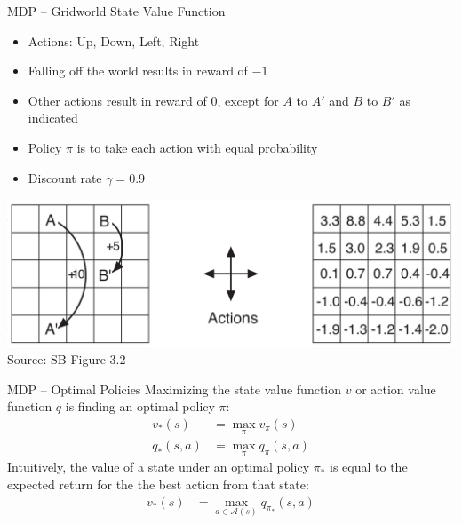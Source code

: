 \documentclass[ignorenonframetext,xcolor=x11names]{beamer}
\begin{document}
\begin{frame}{MDP -- Gridworld State Value Function}
\begin{itemize}
   \item Actions: Up, Down, Left, Right
   \item Falling off the world results in reward of $-1$ 
   \item Other actions result in reward of $0$, except for $A$ to $A'$ and $B$ to $B'$ as indicated
   \item Policy $\pi$ is to take each action with equal probability
   \item Discount rate $\gamma = 0.9$
\end{itemize}
\begin{center}
\includegraphics[width=\textwidth]{screen4.png} \\

\scriptsize Source: SB Figure 3.2 \normalsize
\end{center}
\end{frame}

\begin{frame}{MDP -- Optimal Policies}
Maximizing the state value function $v$ or action value function $q$ is finding an optimal policy $\pi$:
\begin{align*}
v_*(s) &= \operatorname*{max}_\pi v_\pi(s) \\
q_*(s, a) &= \operatorname*{max}_\pi q_\pi(s, a)
\end{align*}
Intuitively, the value of a state under an optimal policy $\pi_*$ is equal to the expected return for the the best action from that state:
\begin{align*}
v_*(s) &= \max_{a \in \mathcal{A}(s)} q_{\pi_*} (s, a) \\
\end{align*}
\end{frame}
\end{document}
